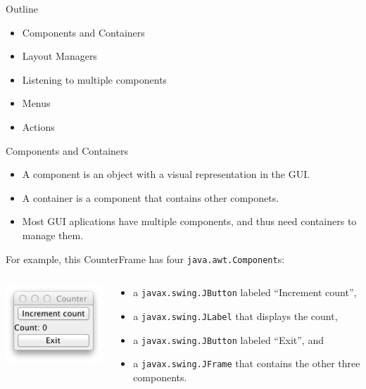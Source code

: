 \documentclass{beamer}
\author[Chris Simpkins]
{Christopher Simpkins \\\texttt{chris.simpkins@gatech.edu}}
\institute[Georgia Tech] %
\date[CS 1331]{}
\begin{document}
\begin{frame}
  \titlepage
\end{frame}

\begin{frame}[fragile]{Outline}


\begin{itemize}
\item Components and Containers
\item Layout Managers
\item Listening to multiple components
\item Menus
\item Actions
\end{itemize}


\end{frame}

\begin{frame}[fragile]{Components and Containers}


\begin{itemize}
\item A component is an object with a visual representation in the GUI.
\item A container is a component that contains other componets.
\item Most GUI aplications have multiple components, and thus need containers to manage them.
\end{itemize}
For example, this CounterFrame has four {\tt java.awt.Component}s:
\begin{columns}[c]
\begin{column}{2in}
\begin{center}
\includegraphics[width=1.75in]{CounterFrame.png}
\end{center}
\end{column}
\begin{column}{3in}
\begin{itemize}
\item a {\tt javax.swing.JButton} labeled ``Increment count'',
\item a {\tt javax.swing.JLabel} that displays the count,
\item a {\tt javax.swing.JButton} labeled ``Exit'', and
\item a {\tt javax.swing.JFrame} that contains the other three components.
\end{itemize}
\end{column}
\end{columns}

\end{frame}
\end{document}
